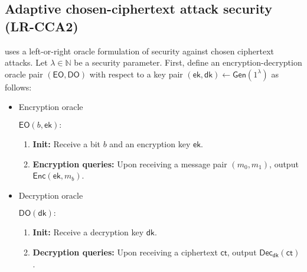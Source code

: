 \documentclass[11pt,letterpaper]{article}
\newcommand{\authnote}[2]{[{\color{red}\textbf{#1:}}~{\color{blue} #2}]}
\newcommand{\authnote}[2]{}
\newcommand{\megan}[1]{\authnote{Megan}{#1}}
\theoremstyle{plain} %
\theoremstyle{definition} %
\theoremstyle{remark} %
\newcommand{\eqdef}{\ {:=} \ }
\newcommand{\SecParam}{\lambda}
\newcommand{\Gen}{\mathsf{Gen}}
\newcommand{\Enc}{\mathsf{Enc}}
\newcommand{\OblivEnc}{\mathsf{OblivEnc}}
\newcommand{\Dec}{\mathsf{Dec}}
\newcommand{\EncKey}{\mathsf{ek}}
\newcommand{\DecKey}{\mathsf{dk}}
\newcommand{\ChallengerBit}{b}
\newcommand{\EncOracle}{\mathsf{EO}}
\newcommand{\DecOracle}{\mathsf{DO}}
\newcommand{\Msg}{m}
\newcommand{\Ct}{\mathsf{ct}}
\newcommand{\Rand}{r}
\newcommand{\Distribution}{\mathcal{D}}
\newcommand{\RandSpace}{\mathcal{R}}
\newcommand{\Naturals}{\mathbb{N}}
\begin{document}
%
%

\subsection{Adaptive chosen-ciphertext attack security (LR-CCA2)}
\label{sec:lr-cca2}
\cite{CanettiF01} uses a left-or-right oracle formulation of security against chosen ciphertext attacks. Let $\SecParam\in\Naturals$ be a security parameter. First, define an encryption-decryption oracle pair $(\EncOracle, \DecOracle)$ with respect to a key pair $(\EncKey,\DecKey) \gets \Gen(1^\SecParam)$ as follows:
\begin{itemize}
	\item Encryption oracle

	\begin{minipage}{0.9\textwidth}
	$\EncOracle(\ChallengerBit,\EncKey):$
	\begin{enumerate}[nolistsep]
		\item \textbf{Init:} Receive a bit $\ChallengerBit$ and an encryption key $\EncKey$.
		\item \textbf{Encryption queries:} Upon receiving a message pair $(\Msg_0, \Msg_1)$, output $\Enc(\EncKey,\Msg_{\ChallengerBit})$.
	\end{enumerate}
	\end{minipage}

	\item Decryption oracle

	\begin{minipage}{0.9\textwidth}
	$\DecOracle(\DecKey):$
	\begin{enumerate}[nolistsep]
		\item \textbf{Init:} Receive a decryption key $\DecKey$.
		\item \textbf{Decryption queries:} Upon receiving a ciphertext $\Ct$, output $\Dec_{\DecKey}(\Ct)$.
	\end{enumerate}
	\end{minipage}
\end{itemize}
\end{document}
